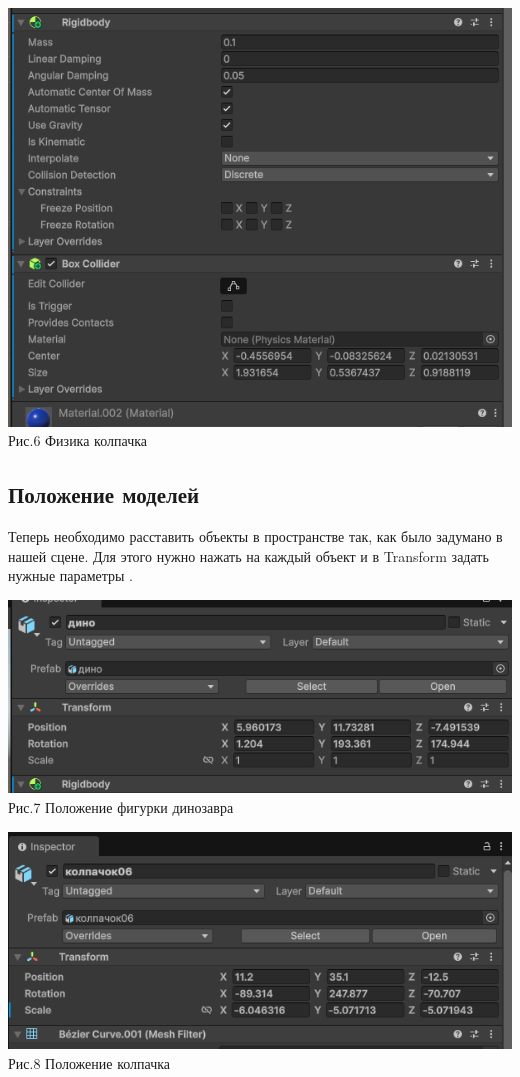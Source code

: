 \documentclass[a4paper,12pt]{article}
\begin{document}
\begin{center}
	\includegraphics[scale = 0.5]{6.png}\\
	Рис.6 Физика колпачка
\end{center}

\subsection{Положение моделей}

Теперь необходимо расставить объекты в пространстве так, как было задумано в нашей сцене. Для этого нужно нажать на каждый объект и в Transform задать нужные параметры .

\begin{center}
	\includegraphics[scale = 0.5]{7.png}\\
	Рис.7 Положение фигурки динозавра
\end{center}

\begin{center}
	\includegraphics[scale = 0.5]{8.png}\\
	Рис.8 Положение колпачка
\end{center}
\end{document}
